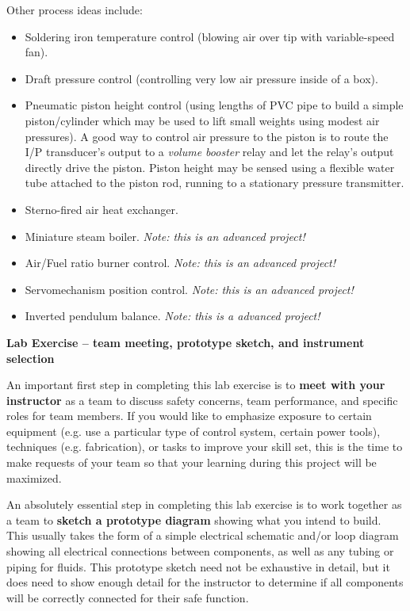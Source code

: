 \noindent
Other process ideas include:

\begin{itemize}
\item{} Soldering iron temperature control (blowing air over tip with variable-speed fan).
\vskip 10pt
\item{} Draft pressure control (controlling very low air pressure inside of a box). 
\vskip 10pt
\item{} Pneumatic piston height control (using lengths of PVC pipe to build a simple piston/cylinder which may be used to lift small weights using modest air pressures).  A good way to control air pressure to the piston is to route the I/P transducer's output to a {\it volume booster} relay and let the relay's output directly drive the piston.  Piston height may be sensed using a flexible water tube attached to the piston rod, running to a stationary pressure transmitter.
\vskip 10pt
\item{} Sterno-fired air heat exchanger. 
\vskip 10pt
\item{} Miniature steam boiler.  {\it Note: this is an advanced project!}
\vskip 10pt
\item{} Air/Fuel ratio burner control.  {\it Note: this is an advanced project!}
\vskip 10pt
\item{} Servomechanism position control.  {\it Note: this is an advanced project!}
\vskip 10pt
\item{} Inverted pendulum balance.  {\it Note: this is a  advanced project!}
\end{itemize}






\vfil \eject

\noindent
{\bf Lab Exercise -- team meeting, prototype sketch, and instrument selection}

\vskip 5pt

An important first step in completing this lab exercise is to {\bf meet with your instructor} as a team to discuss safety concerns, team performance, and specific roles for team members.  If you would like to emphasize exposure to certain equipment (e.g. use a particular type of control system, certain power tools), techniques (e.g. fabrication), or tasks to improve your skill set, this is the time to make requests of your team so that your learning during this project will be maximized.

\vskip 10pt

An absolutely essential step in completing this lab exercise is to work together as a team to {\bf sketch a prototype diagram} showing what you intend to build.  This usually takes the form of a simple electrical schematic and/or loop diagram showing all electrical connections between components, as well as any tubing or piping for fluids.  This prototype sketch need not be exhaustive in detail, but it does need to show enough detail for the instructor to determine if all components will be correctly connected for their safe function.

